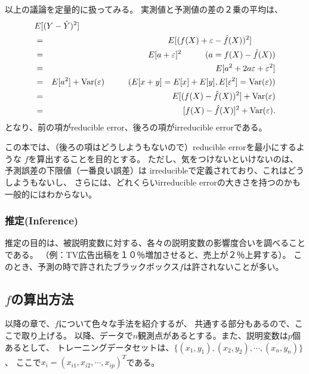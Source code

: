 \documentclass{jsbook}
\begin{document}
以上の議論を定量的に扱ってみる。 実測値と予測値の差の２乗の平均は、
\begin{eqnarray}
\lefteqn{E[(Y - \hat{Y})^2]} \nonumber \\ 
		& = & E[(f(X) + \varepsilon - \hat{f}(X))^2]  \hspace{1cm}  \nonumber \\ 
		& = & E[ a + \varepsilon ]^2 \hspace{1cm} (a = f(X) - \hat{f}(X)) \nonumber \\
		& = & E[ a^2 + 2 a \varepsilon + \varepsilon^2] \nonumber \\
		& = & E[ a^2 ] + \text{Var}(\varepsilon) \hspace{1cm} (E[x+y] = E[x] + E[y], E[\varepsilon^2] = \text{Var}(\varepsilon)) \nonumber \\
		& = & E[ ( f(X) - \hat{f}(X))^2 ] + \text{Var}(\varepsilon) \nonumber \\
		& = & [f(X) - \hat{f}(X)]^2 + \text{Var}(\varepsilon). \label{2:eq diff1}
\end{eqnarray}
となり、前の項がreducible error、後ろの項がirreducible errorである。

この本では、（後ろの項はどうしようもないので）reducible errorを最小にするような
$f$を算出することを目的とする。
ただし、気をつけないといけないのは、予測誤差の下限値（一番良い誤差）は
irreducibleで定義されており、これはどうしようもないし、
さらには、どれくらいirreducible errorの大きさを持つのかも一般的にはわからない。

\subsubsection{推定(Inference)}
推定の目的は、被説明変数に対する、各々の説明変数の影響度合いを調べることである。
（例：TV広告出稿を１０％増加させると、売上が２％上昇する）。
このとき、予測の時で許されたブラックボックス$f$は許されないことが多い。

\subsection{$f$の算出方法}
以降の章で、$f$について色々な手法を紹介するが、
共通する部分もあるので、ここで取り上げる。
以降、データで$n$観測点があるとする。また、説明変数は$p$個あるとして、
トレーニングデータセットは、$\{(x_1, y_1), (x_2, y_2), \cdots, (x_n, y_n)\}$、
ここで$x_i = (x_{i1}, x_{i2}, \cdots, x_{ip})^T$である。
\end{document}
